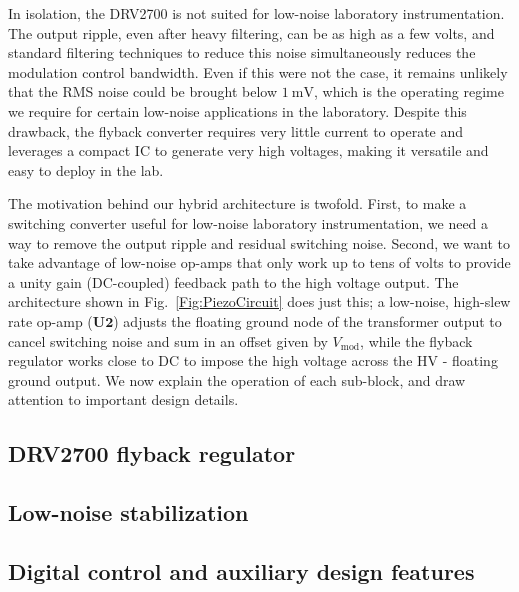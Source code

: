 \documentclass[aip,rsi,reprint]{revtex4-1} %
\begin{document}
In isolation, the DRV2700 is not suited for low-noise laboratory instrumentation. 
The output ripple, even after heavy filtering, can be as high as a few volts, and standard filtering techniques to reduce this noise simultaneously reduces the modulation control bandwidth.
Even if this were not the case, it remains unlikely that the RMS noise could be brought below $\SI{1}{\milli\volt}$, which is the operating regime we require for certain low-noise applications in the laboratory.
Despite this drawback, the flyback converter requires very little current to operate and leverages a compact IC to generate very high voltages, making it versatile and easy to deploy in the lab.

The motivation behind our hybrid architecture is twofold.
First, to make a switching converter useful for low-noise laboratory instrumentation, we need a way to remove the output ripple and residual switching noise.
Second, we want to take advantage of low-noise op-amps that only work up to tens of volts to provide a unity gain (DC-coupled) feedback path to the high voltage output.
The architecture shown in Fig.~\ref{Fig:PiezoCircuit} does just this; a low-noise, high-slew rate op-amp ($\mathbf{U2}$) adjusts the floating ground node of the transformer output to cancel switching noise and sum in an offset given by $V_{\text{mod}}$, while the flyback regulator works close to DC to impose the high voltage across the HV - floating ground output.
We now explain the operation of each sub-block, and draw attention to important design details.

\subsection{DRV2700 flyback regulator}
\label{Sec:DRV2700}

\subsection{Low-noise stabilization}
\label{Sec:LowNoiseStabilization}

\subsection{Digital control and auxiliary design features}
\label{Sec:DigControlAuxDesign}
\end{document}
